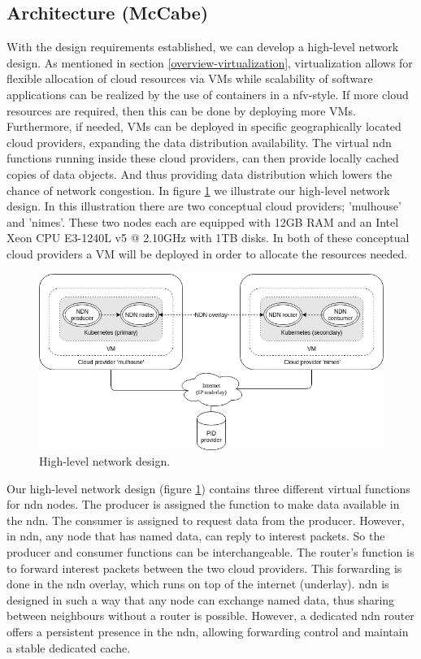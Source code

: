 \subsection{Architecture (McCabe)}
\label{planning-architecture}
With the design requirements established, we can develop a high-level network design. As mentioned in section \ref{overview-virtualization}, virtualization allows for flexible allocation of cloud resources via VMs while scalability of software applications can be realized by the use of containers in a \gls{nfv}-style. If more cloud resources are required, then this can be done by deploying more VMs. Furthermore, if needed, VMs can be deployed in specific geographically located cloud providers, expanding the data distribution availability. The virtual \gls{ndn} functions running inside these cloud providers, can then provide locally cached copies of data objects. And thus providing data distribution which lowers the chance of network congestion. In figure \ref{fig:high-level-network-design} we illustrate our high-level network design. In this illustration there are two conceptual cloud providers; 'mulhouse' and 'nimes'. These two nodes each are equipped with 12GB RAM and an Intel Xeon CPU E3-1240L v5 @ 2.10GHz with 1TB disks. In both of these conceptual cloud providers a VM will be deployed in order to allocate the resources needed.

\begin{figure}[H]
\centering
\includegraphics[width=\columnwidth]{Images/high-level-network-design.png}
\caption{High-level network design.}
\label{fig:high-level-network-design}
\end{figure}

Our high-level network design (figure \ref{fig:high-level-network-design}) contains three different virtual functions for \gls{ndn} nodes. The producer is assigned the function to make data available in the \gls{ndn}. The consumer is assigned to request data from the producer. However, in \gls{ndn}, any node that has named data, can reply to interest packets. So the producer and consumer functions can be interchangeable. The router's function is to forward interest packets between the two cloud providers. This forwarding is done in the \gls{ndn} overlay, which runs on top of the internet (underlay). \gls{ndn} is designed in such a way that any node can exchange named data, thus sharing between neighbours without a router is possible. However, a dedicated \gls{ndn} router offers a persistent presence in the \gls{ndn}, allowing forwarding control and maintain a stable dedicated cache.

